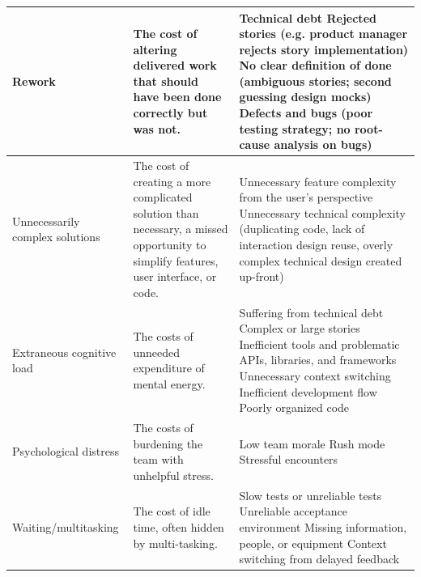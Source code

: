 \begin{table}[t]
\begin{tabular}{|p{1.5in}|p{1.9in}|p{3.2in}|}
Rework                                & The cost of altering delivered work that should have been done correctly but was not. & 
Technical debt \newline
Rejected stories (e.g. product manager rejects story implementation) \newline 
No clear definition of done (ambiguous stories; second guessing design mocks) \newline Defects and bugs (poor testing strategy; no root-cause analysis on bugs)                                                                                                                                                                   \\ \hline
Unnecessarily complex solutions  & The cost of creating a more complicated solution than necessary,  a missed opportunity to simplify features, user interface, or code.      & 
Unnecessary feature complexity from the user's perspective \newline
Unnecessary technical complexity (duplicating code, lack of interaction design reuse, overly complex technical design created up-front)
\\ \hline
Extraneous cognitive load &  The costs of unneeded expenditure of mental energy.  &  
Suffering from technical debt \newline	
Complex or large stories \newline	
Inefficient tools and problematic APIs, libraries, and frameworks \newline	
Unnecessary context switching \newline	
Inefficient development flow \newline	
Poorly organized code	
\\ \hline
Psychological distress & The costs of burdening the team with unhelpful stress. &  
Low team morale \newline
Rush mode \newline
Stressful encounters
\\ \hline
Waiting/multitasking                             & The cost of idle time, often hidden by multi-tasking. & Slow tests or unreliable tests \newline Unreliable acceptance environment \newline Missing information, people, or equipment \newline
Context switching from delayed feedback                                                                                                                                                                                                                                                                          \\ \hline

\end{tabular}
\end{table}
